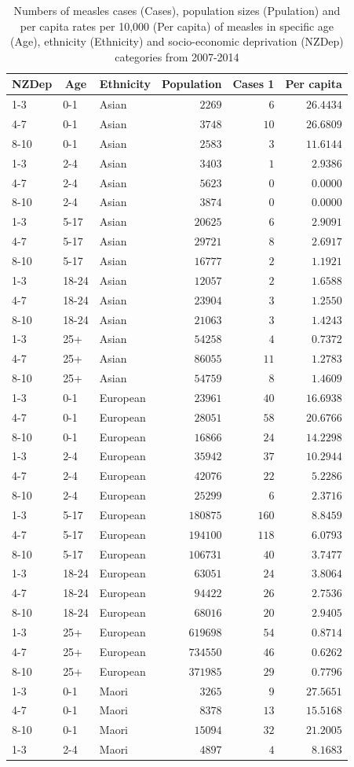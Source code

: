 \documentclass{article}
\begin{document}
\begin{table}[hbtp]
\footnotesize
\caption{Numbers of measles cases (Cases), population sizes (Ppulation) and per capita rates per 10,000 (Per capita) of measles in specific age (Age), ethnicity (Ethnicity) and socio-economic deprivation (NZDep) categories from 2007-2014}
\begin{center}
\begin{tabular}{lllrrr}
\hline\hline
\multicolumn{1}{c}{NZDep}&\multicolumn{1}{c}{Age}&\multicolumn{1}{c}{Ethnicity}&\multicolumn{1}{c}{Population}&\multicolumn{1}{c}{Cases 1}&\multicolumn{1}{c}{Per capita}\tabularnewline
\hline
1-3&0-1&Asian&$  2269$&$  6$&$26.4434$\tabularnewline
4-7&0-1&Asian&$  3748$&$ 10$&$26.6809$\tabularnewline
8-10&0-1&Asian&$  2583$&$  3$&$11.6144$\tabularnewline
1-3&2-4&Asian&$  3403$&$  1$&$ 2.9386$\tabularnewline
4-7&2-4&Asian&$  5623$&$  0$&$ 0.0000$\tabularnewline
8-10&2-4&Asian&$  3874$&$  0$&$ 0.0000$\tabularnewline
1-3&5-17&Asian&$ 20625$&$  6$&$ 2.9091$\tabularnewline
4-7&5-17&Asian&$ 29721$&$  8$&$ 2.6917$\tabularnewline
8-10&5-17&Asian&$ 16777$&$  2$&$ 1.1921$\tabularnewline
1-3&18-24&Asian&$ 12057$&$  2$&$ 1.6588$\tabularnewline
4-7&18-24&Asian&$ 23904$&$  3$&$ 1.2550$\tabularnewline
8-10&18-24&Asian&$ 21063$&$  3$&$ 1.4243$\tabularnewline
1-3&25+&Asian&$ 54258$&$  4$&$ 0.7372$\tabularnewline
4-7&25+&Asian&$ 86055$&$ 11$&$ 1.2783$\tabularnewline
8-10&25+&Asian&$ 54759$&$  8$&$ 1.4609$\tabularnewline
1-3&0-1&European&$ 23961$&$ 40$&$16.6938$\tabularnewline
4-7&0-1&European&$ 28051$&$ 58$&$20.6766$\tabularnewline
8-10&0-1&European&$ 16866$&$ 24$&$14.2298$\tabularnewline
1-3&2-4&European&$ 35942$&$ 37$&$10.2944$\tabularnewline
4-7&2-4&European&$ 42076$&$ 22$&$ 5.2286$\tabularnewline
8-10&2-4&European&$ 25299$&$  6$&$ 2.3716$\tabularnewline
1-3&5-17&European&$180875$&$160$&$ 8.8459$\tabularnewline
4-7&5-17&European&$194100$&$118$&$ 6.0793$\tabularnewline
8-10&5-17&European&$106731$&$ 40$&$ 3.7477$\tabularnewline
1-3&18-24&European&$ 63051$&$ 24$&$ 3.8064$\tabularnewline
4-7&18-24&European&$ 94422$&$ 26$&$ 2.7536$\tabularnewline
8-10&18-24&European&$ 68016$&$ 20$&$ 2.9405$\tabularnewline
1-3&25+&European&$619698$&$ 54$&$ 0.8714$\tabularnewline
4-7&25+&European&$734550$&$ 46$&$ 0.6262$\tabularnewline
8-10&25+&European&$371985$&$ 29$&$ 0.7796$\tabularnewline
1-3&0-1&Maori&$  3265$&$  9$&$27.5651$\tabularnewline
4-7&0-1&Maori&$  8378$&$ 13$&$15.5168$\tabularnewline
8-10&0-1&Maori&$ 15094$&$ 32$&$21.2005$\tabularnewline
1-3&2-4&Maori&$  4897$&$  4$&$ 8.1683$\tabularnewline

\end{tabular}
\end{center}
\end{table}
\end{document}
